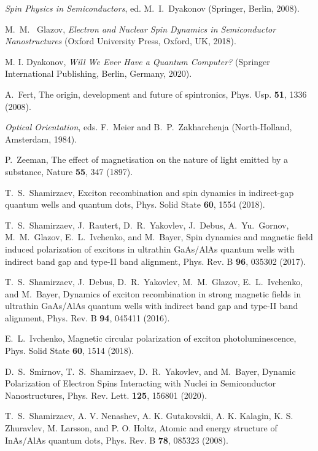 \documentclass[twocolumn,showpacs,preprintnumbers,amsmath,amssymb,aps]{revtex4-1}
\begin{document}
\begin{thebibliography}{}

\makeatletter
{} \textit{Spin Physics in Semiconductors}, ed. M.~I.~Dyakonov (Springer, Berlin, 2008).

 M.~M.~ Glazov, \textit{Electron  and  Nuclear  Spin  Dynamics  in Semiconductor Nanostructures}  (Oxford University Press, Oxford, UK, 2018).

 M. I. Dyakonov, \textit{Will We Ever Have a Quantum Computer?}
 (Springer International Publishing, Berlin, Germany, 2020).

 A.~Fert, The origin, development and future of spintronics, Phys. Usp. \textbf{51}, 1336 (2008).

\textit{Optical Orientation}, eds. F.~Meier and B.~P.~Zakharchenja (North-Holland, Amsterdam, 1984).

 P.~Zeeman, The effect of magnetisation on the nature of light emitted by a substance, Nature \textbf{55}, 347 (1897).

 T.~S.~Shamirzaev, Exciton recombination and spin
dynamics in indirect-gap quantum wells and quantum dots,  Phys.
Solid State \textbf{60}, 1554 (2018).

  T.~S.~Shamirzaev, J.~Rautert, D.~R.~Yakovlev, J.~Debus, A.~Yu.~Gornov, M.~M.~Glazov, E.~L.~Ivchenko, and M.~Bayer, Spin
dynamics and magnetic field induced polarization of excitons in
ultrathin GaAs/AlAs quantum wells with indirect band gap and type-II
band alignment, Phys. Rev. B \textbf{96}, 035302 (2017).

 T.~S.~Shamirzaev, J.~Debus, D.~R.~Yakovlev, M.~M.~Glazov, E.~L.~Ivchenko, and M.~Bayer, Dynamics of exciton recombination in strong magnetic fields in ultrathin GaAs/AlAs quantum wells
with indirect band gap and type-II band alignment, Phys. Rev. B
\textbf{94}, 045411 (2016).

 E.~L.~Ivchenko, Magnetic circular polarization of exciton photoluminescence,  Phys. Solid State \textbf{60}, 1514 (2018).

 D.~S.~Smirnov, T.~S.~Shamirzaev, D.~R.~Yakovlev, and
M.~Bayer, Dynamic Polarization of Electron Spins Interacting with
Nuclei in Semiconductor Nanostructures, Phys. Rev. Lett.
\textbf{125}, 156801 (2020).

 T.~S.~Shamirzaev, A. V. Nenashev, A. K. Gutakovskii, A. K. Kalagin, K. S. Zhuravlev, M. Larsson, and P. O. Holtz,
Atomic and energy structure of InAs/AlAs quantum dots, Phys. Rev. B
\textbf{78}, 085323 (2008).


\end{thebibliography}
\end{document}
